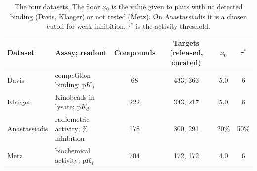 \documentclass{article}
\begin{document}
\setcounter{table}{0}
\begin{table}[h]
  \centering
  \caption{The four datasets. The floor $x_0$ is the value given to pairs with
           no detected binding (Davis, Klaeger) or not tested (Metz). On
           Anastassiadis it is a chosen cutoff for weak inhibition.
           $\tau^*$ is the activity threshold.}
  \label{tab:datasets}
  \footnotesize
  \setlength{\tabcolsep}{3pt}
  \begin{tabular}{llcccc}
    \toprule
    Dataset & Assay; readout & Compounds & Targets (released, curated) & $x_0$ & $\tau^*$ \\
    \midrule
    Davis         & competition binding; $\mathrm{p}K_d$  & 68  & 433, 363 & 5.0    & 6 \\
    Klaeger       & Kinobeads in lysate; $\mathrm{p}K_d$  & 222 & 343, 217 & 5.0    & 6 \\
    Anastassiadis & radiometric activity; \% inhibition  & 178 & 300, 291 & 20\%   & 50\% \\
    Metz          & biochemical activity; $\mathrm{p}K_i$ & 704 & 172, 172 & 4.0    & 6 \\
    \bottomrule
  \end{tabular}
\end{table}
\end{document}
